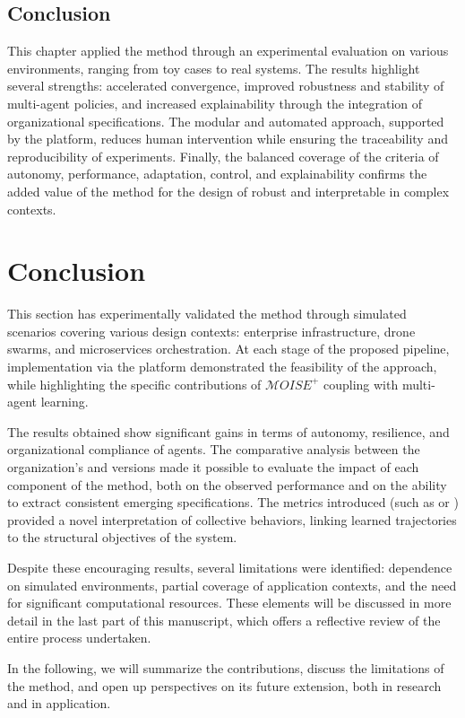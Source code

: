 \section{Conclusion}

This chapter applied the  method through an experimental evaluation on various environments, ranging from toy cases to real systems. The results highlight several strengths: accelerated convergence, improved robustness and stability of multi-agent policies, and increased explainability through the integration of organizational specifications. The modular and automated approach, supported by the  platform, reduces human intervention while ensuring the traceability and reproducibility of experiments. Finally, the balanced coverage of the criteria of autonomy, performance, adaptation, control, and explainability confirms the added value of the method for the design of robust and interpretable  in complex contexts.

\clearpage
\thispagestyle{empty}
\null
\newpage


\chapter*{Conclusion}

This section has experimentally validated the  method through simulated scenarios covering various  design contexts: enterprise infrastructure, drone swarms, and microservices orchestration. At each stage of the proposed pipeline, implementation via the  platform demonstrated the feasibility of the approach, while highlighting the specific contributions of $\mathcal{M}OISE^+$ coupling with multi-agent learning.

The results obtained show significant gains in terms of autonomy, resilience, and organizational compliance of agents. The comparative analysis between the organization's  and  versions made it possible to evaluate the impact of each component of the method, both on the observed performance and on the ability to extract consistent emerging specifications. The metrics introduced (such as  or ) provided a novel interpretation of collective behaviors, linking learned trajectories to the structural objectives of the system.

Despite these encouraging results, several limitations were identified: dependence on simulated environments, partial coverage of application contexts, and the need for significant computational resources. These elements will be discussed in more detail in the last part of this manuscript, which offers a reflective review of the entire process undertaken.

\vspace{1em}

\noindent
In the following, we will summarize the contributions, discuss the limitations of the method, and open up perspectives on its future extension, both in research and in application.
